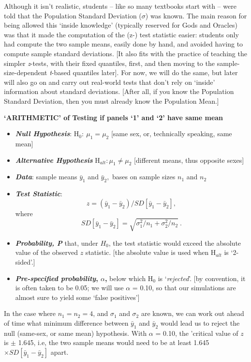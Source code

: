 \documentclass[]{book}
\begin{document}
Although it isn't realistic, students -- like so many textbooks start with -- were told that the Population Standard Deviation (\(\sigma\)) was known. The main reason for being allowed this `inside knowledge' (typically reserved for Gods and Oracles)
was that it made the computation of the (z-) test statistic easier: students only had compute the two sample means, easily done by hand, and avoided having to compute sample standard deviations. {[}It also fits with the practice of teaching the simpler \emph{z}-tests, with their fixed quantiles, first, and then moving to the sample-size-dependent \emph{t}-based quantiles later{]}. For now, we will do the same, but later will also go on and carry out real-world tests that don't rely on `inside' information about standard deviations. {[}After all, if you know the Population Standard Deviation, then you must already know the Population Mean.{]}

\textbf{`ARITHMETIC' of Testing if panels `1' and `2' have same mean}

\begin{itemize}
\item
  \textbf{\emph{Null Hypothesis}}: H\(_0: \ \mu_1 = \mu_2\) {[}same sex, or, technically speaking, same mean{]}
\item
  \textbf{\emph{Alternative Hypothesis}} H\(_{alt}: \mu_1 \ne \mu_2\) {[}different means, thus opposite sexes{]}
\item
  \textbf{\emph{Data}}: sample means \(\bar{y}_1\) and \(\bar{y}_2,\) bases on sample sizes \(n_1\) and \(n_2\)
\item
  \textbf{\emph{Test Statistic}}:
  \[z = (\bar{y}_1- \bar{y}_2) / SD[\bar{y}_1 - \bar{y}_2],\] where \[SD[\bar{y}_1 - \bar{y}_2] = \sqrt{\sigma^2_1/n_1 + \sigma^2_2/n_2} \ .\]
\item
  \textbf{\emph{Probability, P}} that, under \(H_0\), the test statistic would exceed the absolute value of the observed \(z\) statistic. {[}the absolute value is used when H\(_{alt}\) is `2-sided'.{]}
\item
  \textbf{\emph{Pre-specified probability}, \(\alpha\),} below which H\(_0\) is `\emph{rejected}'. {[}by convention, it is often taken to be 0.05; we will use \(\alpha\) = 0.10, so that our simulations are almost sure to yield some `false positives'{]}
\end{itemize}

In the case where \(n_1 = n_2 = 4\), and \(\sigma_1\) and \(\sigma_2\) are known, we can work out ahead of time what minimum difference between \(\bar{y}_1\) and \(\bar{y}_2\)
would lead us to reject the null (same-sex, or same mean) hypothesis. With \(\alpha\) = 0.10, the 'critical value of \(z\) is \(\pm\) 1.645, i.e, the two sample means would need to be at least 1.645 \(\times SD[\bar{y}_1 - \bar{y}_2]\) apart.
\end{document}
